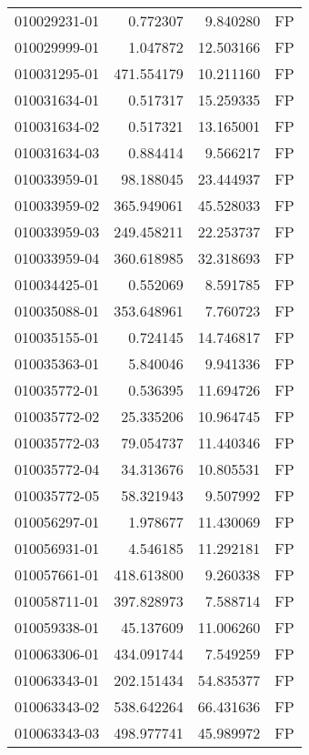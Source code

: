\begin{tabular}{lrrl}
010029231-01 &    0.772307 &       9.840280 &   FP \\
010029999-01 &    1.047872 &      12.503166 &   FP \\
010031295-01 &  471.554179 &      10.211160 &   FP \\
010031634-01 &    0.517317 &      15.259335 &   FP \\
010031634-02 &    0.517321 &      13.165001 &   FP \\
010031634-03 &    0.884414 &       9.566217 &   FP \\
010033959-01 &   98.188045 &      23.444937 &   FP \\
010033959-02 &  365.949061 &      45.528033 &   FP \\
010033959-03 &  249.458211 &      22.253737 &   FP \\
010033959-04 &  360.618985 &      32.318693 &   FP \\
010034425-01 &    0.552069 &       8.591785 &   FP \\
010035088-01 &  353.648961 &       7.760723 &   FP \\
010035155-01 &    0.724145 &      14.746817 &   FP \\
010035363-01 &    5.840046 &       9.941336 &   FP \\
010035772-01 &    0.536395 &      11.694726 &   FP \\
010035772-02 &   25.335206 &      10.964745 &   FP \\
010035772-03 &   79.054737 &      11.440346 &   FP \\
010035772-04 &   34.313676 &      10.805531 &   FP \\
010035772-05 &   58.321943 &       9.507992 &   FP \\
010056297-01 &    1.978677 &      11.430069 &   FP \\
010056931-01 &    4.546185 &      11.292181 &   FP \\
010057661-01 &  418.613800 &       9.260338 &   FP \\
010058711-01 &  397.828973 &       7.588714 &   FP \\
010059338-01 &   45.137609 &      11.006260 &   FP \\
010063306-01 &  434.091744 &       7.549259 &   FP \\
010063343-01 &  202.151434 &      54.835377 &   FP \\
010063343-02 &  538.642264 &      66.431636 &   FP \\
010063343-03 &  498.977741 &      45.989972 &   FP \\

\end{tabular}
